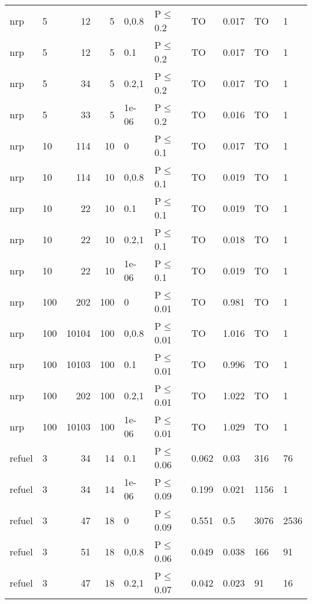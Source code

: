 \begin{longtable}{llrrllllll}
 nrp           & 5         &     	12 &   5 & 0,0.8 & P$\leq$0.2   & TO      & 0.017    & TO     & 1      \\
 nrp           & 5         &     	12 &   5 & 0.1   & P$\leq$0.2   & TO      & 0.017    & TO     & 1      \\
 nrp           & 5         &     	34 &   5 & 0.2,1 & P$\leq$0.2   & TO      & 0.017    & TO     & 1      \\
 nrp           & 5         &     	33 &   5 & 1e-06 & P$\leq$0.2   & TO      & 0.016    & TO     & 1      \\
 nrp           & 10        &    	114 &  10 & 0     & P$\leq$0.1   & TO      & 0.017    & TO     & 1      \\
 nrp           & 10        &    	114 &  10 & 0,0.8 & P$\leq$0.1   & TO      & 0.019    & TO     & 1      \\
 nrp           & 10        &     	22 &  10 & 0.1   & P$\leq$0.1   & TO      & 0.019    & TO     & 1      \\
 nrp           & 10        &     	22 &  10 & 0.2,1 & P$\leq$0.1   & TO      & 0.018    & TO     & 1      \\
 nrp           & 10        &     	22 &  10 & 1e-06 & P$\leq$0.1   & TO      & 0.019    & TO     & 1      \\
 nrp           & 100       &    	202 & 100 & 0     & P$\leq$0.01  & TO      & 0.981    & TO     & 1      \\
 nrp           & 100       &  	10104 & 100 & 0,0.8 & P$\leq$0.01  & TO      & 1.016    & TO     & 1      \\
 nrp           & 100       &  	10103 & 100 & 0.1   & P$\leq$0.01  & TO      & 0.996    & TO     & 1      \\
 nrp           & 100       &    	202 & 100 & 0.2,1 & P$\leq$0.01  & TO      & 1.022    & TO     & 1      \\
 nrp           & 100       &  	10103 & 100 & 1e-06 & P$\leq$0.01  & TO      & 1.029    & TO     & 1      \\
 refuel        & 3         &     	34 &  14 & 0.1   & P$\leq$0.06  & 0.062   & 0.03     & 316    & 76     \\
 refuel        & 3         &     	34 &  14 & 1e-06 & P$\leq$0.09  & 0.199   & 0.021    & 1156   & 1      \\
 refuel        & 3         &     	47 &  18 & 0     & P$\leq$0.09  & 0.551   & 0.5      & 3076   & 2536   \\
 refuel        & 3         &     	51 &  18 & 0,0.8 & P$\leq$0.06  & 0.049   & 0.038    & 166    & 91     \\
 refuel        & 3         &     	47 &  18 & 0.2,1 & P$\leq$0.07  & 0.042   & 0.023    & 91     & 16     \\
\bottomrule
\end{longtable}
